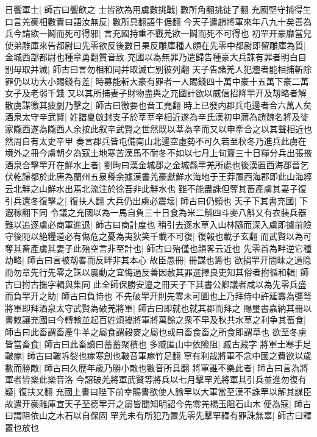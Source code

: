 日饗軍士|{
	師古曰饗飲之}
士皆欲為用虜數挑戰|{
	數所角翻挑徒了翻}
充國堅守捕得生口言羌豪相數責曰語汝無反|{
	數所具翻語牛倨翻}
今天子遣趙將軍來年八九十矣善為兵今請欲一鬭而死可得邪|{
	言充國持重不戰羌欲一鬭而死不可得也}
初䍐开豪靡當兒使弟雕庫來告都尉曰先零欲反後數日果反雕庫種人頗在先零中都尉即留雕庫為質|{
	金城西部都尉也種章勇翻質音致}
充國以為無罪乃遣歸告種豪大兵誅有罪者明白自别毋取并滅|{
	師古曰言勿相和同并取滅亡别彼列翻}
天子告諸羌人犯灋者能相捕斬除罪仍以功大小賜錢有差|{
	時募能斬大豪有罪者一人賜錢四十萬中豪十五萬下豪二萬女子及老弱千錢}
又以其所捕妻子財物盡與之充國計欲以威信招降䍐开及刼略者解散虜謀徼其疲劇乃擊之|{
	師古曰徼要也音工堯翻}
時上已發内郡兵屯邊者合六萬人矣酒泉太守辛武賢|{
	姓譜夏啟封支子於莘莘辛相近遂為辛氏漢初申蒲為趙魏名將及徙家隴西遂為隴西人余按此叙辛武賢之世然既以莘為辛而又以申牽合之以其聲相近也然周自有太史辛甲}
奏言郡兵皆屯備南山北邊空虛勢不可久若至秋冬乃進兵此虜在境外之冊今虜朝夕為寇土地寒苦漢馬不耐冬不如以七月上旬齎三十日糧分兵出張掖酒泉合擊䍐开在鮮水上者|{
	劉昫曰漢金城郡之金城縣䍐羌所處也後漢置西海郡晉乞伏乾歸都於此唐為蘭州五泉縣余據漢書羌豪獻鮮水海地于王莽置西海郡即此山海經云北鮮之山鮮水出焉北流注於徐吾非此鮮水也}
雖不能盡誅但奪其畜產虜其妻子復引兵還冬復擊之|{
	復扶人翻}
大兵仍出虜必震壞|{
	師古曰仍頻也}
天子下其書充國|{
	下遐稼翻下同}
令議之充國以為一馬自負三十日食為米二斛四斗麥八斛又有衣裝兵器難以追逐虜必商軍進退|{
	師古曰商計度也}
稍引去逐水草入山林隨而深入虜即據前險守後阨以絶糧道必有傷危之憂為夷狄笑千載不可復|{
	復報也載子玄翻}
而武賢以為可奪其畜產虜其妻子此殆空言非至計也|{
	師古曰殆僅也韻畧云近也}
先零首為畔逆它種劫略|{
	師古曰言被刼畧而反畔非其本心}
故臣愚冊|{
	冊謀也籌也}
欲捐䍐开闇昧之過隐而勿章先行先零之誅以震動之宜悔過反善因赦其罪選擇良吏知其俗者拊循和輯|{
	師古曰拊古撫字輯與集同}
此全師保勝安邉之冊天子下其書公卿議者咸以為先零兵盛而負䍐开之助|{
	師古曰負恃也}
不先破䍐开則先零未可圖也上乃拜侍中許延壽為彊弩將軍即拜酒泉太守武賢為破羌將軍|{
	師古曰即就也就其郡而拜之}
賜璽書嘉納其冊以書敕讓充國曰今轉輸並起百姓煩擾將軍將萬餘之衆不早及秋共水草之利争其畜食|{
	師古曰此畜謂畜產牛羊之屬食謂穀麥之屬也或曰畜食畜之所食即謂草也}
欲至冬虜皆當畜食|{
	師古曰此畜讀曰蓄蓄聚積也}
多臧匿山中依險阻|{
	臧古藏字}
將軍士寒手足皸瘃|{
	師古曰皸坼裂也瘃寒創也皸音軍瘃竹足翻}
寧有利哉將軍不念中國之費欲以歲數而勝敵|{
	師古曰久歷年歲乃勝小敵也數音所具翻}
將軍誰不樂此者|{
	師古曰言為將軍者皆樂此樂音洛}
今詔破羌將軍武賢等將兵以七月擊䍐羌將軍其引兵並進勿復有疑|{
	復扶又翻}
充國上書曰陛下前幸賜書欲使人諭䍐以大軍當至漢不誅䍐以解其謀臣故遣开豪雕庫宣天子至德䍐开之屬皆聞知明詔今先零羌楊玉阻石山木便為寇|{
	師古曰謂阻依山之木石以自保固}
䍐羌未有所犯乃置先零先擊䍐釋有罪誅無辜|{
	師古曰釋置也放也}
